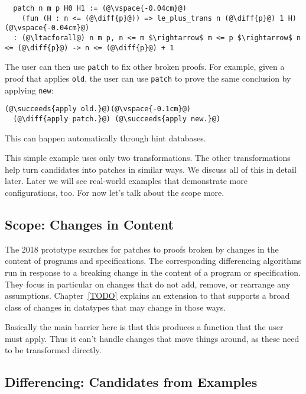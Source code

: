 \begin{lstlisting}
  patch n m p H0 H1 := (@\vspace{-0.04cm}@)
    (fun (H : n <= (@\diff{p}@)) => le_plus_trans n (@\diff{p}@) 1 H)(@\vspace{-0.04cm}@)
  : (@\ltacforall@) n m p, n <= m $\rightarrow$ m <= p $\rightarrow$ n <= (@\diff{p}@) -> n <= (@\diff{p}@) + 1
\end{lstlisting}
The user can then use \lstinline{patch} to fix other broken proofs.
For example, given a proof that applies \lstinline{old}, the user can use \lstinline{patch} to prove the same conclusion
by applying \lstinline{new}:

\begin{lstlisting}[language=coq]
  (@\succeeds{apply old.}@)(@\vspace{-0.1cm}@)
  (@\diff{apply patch.}@) (@\succeeds{apply new.}@)
\end{lstlisting}
This can happen automatically through hint databases.

This simple example uses only two transformations. The other transformations help turn candidates
into patches in similar ways. We discuss all of this in detail later.
Later we will see real-world examples that demonstrate more configurations, too.
For now let's talk about the scope more.

\subsection{Scope: Changes in Content}

The 2018 \sysname prototype searches for patches to proofs broken by changes in the content of programs and specifications.
The corresponding differencing algorithms run in response to a breaking change in the content of a program or specification. %
They focus in particular on changes that do not add, remove, or rearrange any assumptions.
Chapter~\ref{TODO} explains an extension to \sysname that supports a broad class of
changes in datatypes that may change in those ways.

Basically the main barrier here is that this produces a function that the user must apply.
Thus it can't handle changes that move things around, as these need to be transformed directly.

\subsection{Differencing: Candidates from Examples}

